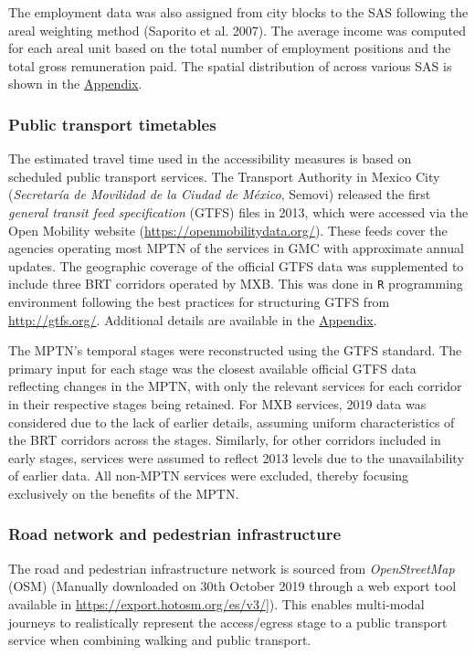 \documentclass{article}
\begin{document}
The employment data was also assigned from city blocks to the SAS
following the areal weighting method (Saporito et al. 2007). The average
income was computed for each areal unit based on the total number of
employment positions and the total gross remuneration paid. The spatial
distribution of across various SAS is shown in the
\hyperref[appendix]{Appendix}.

\subsubsection{Public transport
timetables}\label{public-transport-timetables}

The estimated travel time used in the accessibility measures is based on
scheduled public transport services. The Transport Authority in Mexico
City (\emph{Secretaría de Movilidad de la Ciudad de México}, Semovi)
released the first \emph{general transit feed specification} (GTFS)
files in 2013, which were accessed via the Open Mobility website
(\url{https://openmobilitydata.org/}). These feeds cover the agencies
operating most MPTN of the services in GMC with approximate annual
updates. The geographic coverage of the official GTFS data was
supplemented to include three BRT corridors operated by MXB. This was
done in \texttt{R} programming environment following the best practices
for structuring GTFS from \url{http://gtfs.org/}. Additional details are
available in the \hyperref[appendix]{Appendix}.

The MPTN's temporal stages were reconstructed using the GTFS standard.
The primary input for each stage was the closest available official GTFS
data reflecting changes in the MPTN, with only the relevant services for
each corridor in their respective stages being retained. For MXB
services, 2019 data was considered due to the lack of earlier details,
assuming uniform characteristics of the BRT corridors across the stages.
Similarly, for other corridors included in early stages, services were
assumed to reflect 2013 levels due to the unavailability of earlier
data. All non-MPTN services were excluded, thereby focusing exclusively
on the benefits of the MPTN.

\subsubsection{Road network and pedestrian
infrastructure}\label{road-network-and-pedestrian-infrastructure}

The road and pedestrian infrastructure network is sourced from
\emph{OpenStreetMap} (OSM) (Manually downloaded on 30th October 2019
through a web export tool available in
\url{https://export.hotosm.org/es/v3/}{]}). This enables multi-modal
journeys to realistically represent the access/egress stage to a public
transport service when combining walking and public transport.
\end{document}
